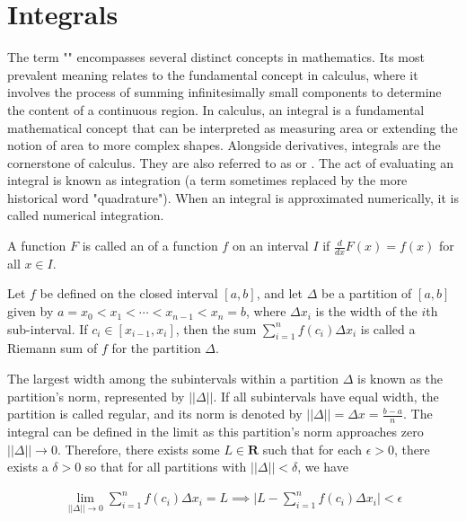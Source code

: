\section{Integrals}

The term "" encompasses several distinct concepts in mathematics. Its most prevalent meaning relates to the fundamental concept in calculus, where it involves the process of summing infinitesimally small components to determine the content of a continuous region. In calculus, an integral is a fundamental mathematical concept that can be interpreted as measuring area or extending the notion of area to more complex shapes. Alongside derivatives, integrals are the cornerstone of calculus. They are also referred to as  or . The act of evaluating an integral is known as integration (a term sometimes replaced by the more historical word "quadrature"). When an integral is approximated numerically, it is called numerical integration.

\begin{defn}{1}
A function $F$ is called an  of a function $f$ on an interval $I$ if $\frac{d}{dx}F(x)=f(x)$ for all $x\in I$.
\end{defn}

\begin{defn}[Riemann Sum\label{defn:Riemann Sum]{1}
Let $f$ be defined on the closed interval $[a,b]$, and let $\Delta$ be a partition of $[a,b]$ given by $a=x_0 < x_1 < \cdots < x_{n-1} < x_n = b$, where $\Delta x_i$ is the width of the $i$th sub-interval. If $c_i \in [x_{i-1},x_i]$, then the sum $\sum_{i=1}^{n}f(c_i)\Delta x_i$ is called a Riemann sum of $f$ for the partition $\Delta$.
\end{defn}

The largest width among the subintervals within a partition $\Delta$ is known as the partition's norm, represented by $||\Delta||$. If all subintervals have equal width, the partition is called regular, and its norm is denoted by $||\Delta|| = \Delta x = \frac{b-a}{n}$. The integral can be defined in the limit as this partition's norm approaches zero $||\Delta|| \to 0$. Therefore, there exists some $L\in\mathbf{R}$ such that for each $\epsilon > 0$, there exists a $\delta > 0$ so that for all partitions with $||\Delta|| < \delta$, we have

\begin{align}
\lim_{||\Delta|| \to 0}\sum_{i=1}^{n}f(c_i)\Delta x_i = L \implies \bigg|L-\sum_{i=1}^{n}f(c_i)\Delta x_i\bigg| < \epsilon
\end{align}

